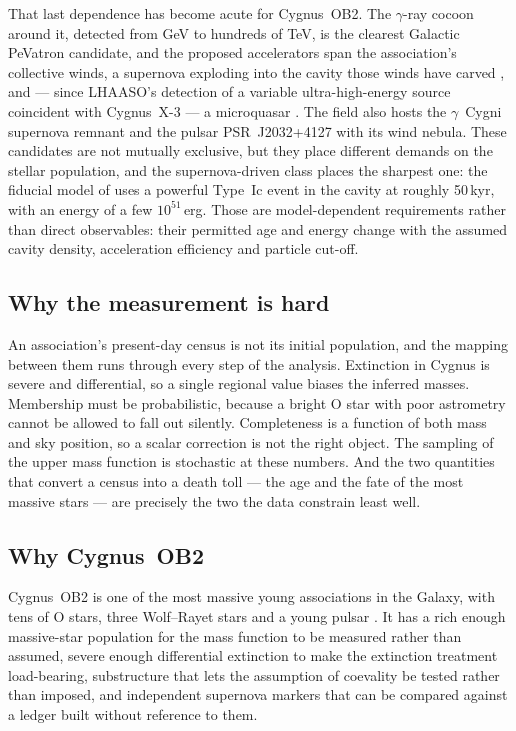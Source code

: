 \documentclass{aa}
\begin{document}
That last dependence has become acute for Cygnus~OB2. The $\gamma$-ray cocoon
around it, detected from GeV to hundreds of TeV, is the clearest Galactic
PeVatron candidate, and the proposed accelerators span the association's
collective winds, a supernova exploding into the cavity those winds have carved
\citep{harer2025, suppresseddiffusion2026}, and --- since LHAASO's detection of
a variable ultra-high-energy source coincident with Cygnus~X-3 --- a microquasar
\citep{cygx3pevatron2026}. The field also hosts the $\gamma$~Cygni supernova
remnant and the pulsar PSR~J2032+4127 with its wind nebula. These candidates are
not mutually exclusive, but they place different demands on the stellar
population, and the supernova-driven class places the sharpest one:
the fiducial model of \citet{harer2025} uses a powerful Type~Ic event in the
cavity at roughly 50\,kyr, with an energy of a few $10^{51}$\,erg. Those are
model-dependent requirements rather than direct observables: their permitted
age and energy change with the assumed cavity density, acceleration efficiency
and particle cut-off.

\subsection{Why the measurement is hard}

An association's present-day census is not its initial population, and the
mapping between them runs through every step of the analysis. Extinction in
Cygnus is severe and differential, so a single regional value biases the
inferred masses. Membership must be probabilistic, because a bright O star with
poor astrometry cannot be allowed to fall out silently. Completeness is a
function of both mass and sky position, so a scalar correction is not the right
object. The sampling of the upper mass function is stochastic at these numbers.
And the two quantities that convert a census into a death toll --- the age and
the fate of the most massive stars --- are precisely the two the data constrain
least well.

\subsection{Why Cygnus~OB2}

Cygnus~OB2 is one of the most massive young associations in the Galaxy, with
tens of O stars, three Wolf--Rayet stars and a young pulsar
\citep{wright2015, berlanas2020}. It has a rich enough massive-star population
for the mass function to be measured rather than assumed, severe enough
differential extinction to make the extinction treatment load-bearing,
substructure that lets the assumption of coevality be tested rather than
imposed, and independent supernova markers that can be compared against a ledger
built without reference to them.
\end{document}
